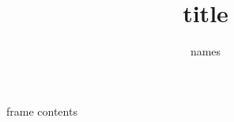 \documentclass{beamer}
\author{names}
\title{title}
\begin{document}
\begin{frame}
  frame contents
\end{frame}
\end{document}
